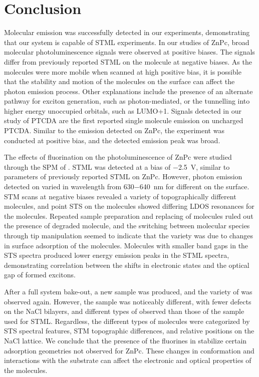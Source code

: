 
\chapter{Conclusion}
\label{ch:conc}


Molecular emission was successfully detected in our experiments, demonstrating that our system is capable of \ac{STML} experiments. In our studies of \ac{ZnPc}, broad molecular photoluminescence signals were observed at positive biases. The signals differ from previously reported \ac{STML} on the molecule at negative biases. As the molecules were more mobile when scanned at high positive bias, it is possible that the stability and motion of the molecules on the surface can affect the photon emission process. Other explanations include the presence of an alternate pathway for exciton generation, such as photon-mediated, or the tunnelling into higher energy unoccupied orbitals, such as LUMO+1. Signals detected in our study of \ac{PTCDA} are the first reported single molecule emission on uncharged \ac{PTCDA}. Similar to the emission detected on \ac{ZnPc}, the experiment was conducted at positive bias, and the detected emission peak was broad.

The effects of fluorination on the photoluminescence of ZnPc were studied through the \ac{SPM} of . \ac{STML} was detected at a bias of \SI{-2.5}{V}, similar to parameters of previously reported \ac{STML} on ZnPc. However, photon emission detected on  varied in wavelength from \SI{630-640}{nm} for different  on the surface. \ac{STM} scans at negative biases revealed a variety of topographically different molecules, and point \ac{STS} on the molecules showed differing \ac{LDOS} resonances for the molecules. Repeated sample preparation and replacing of molecules ruled out the presence of degraded molecule, and the switching between molecular species through tip manipulation seemed to indicate that the variety was due to changes in surface adsorption of the molecules. Molecules with smaller band gaps in the \ac{STS} spectra produced lower energy emission peaks in the \ac{STML} spectra, demonstrating correlation between the shifts in electronic states and the optical gap of formed excitons.

After a full system bake-out, a new sample was produced, and the variety of  was observed again. However, the sample was noticeably different, with fewer defects on the NaCl bilayers, and different types of  observed than those of the sample used for \ac{STML}. Regardless, the different types of molecules were categorized by \ac{STS} spectral features, \ac{STM} topographic differences, and relative positions on the NaCl lattice. We conclude that the presence of the fluorines in  stabilize certain adsorption geometries not observed for ZnPc. These changes in conformation and interactions with the substrate can affect the electronic and optical properties of the molecules.

